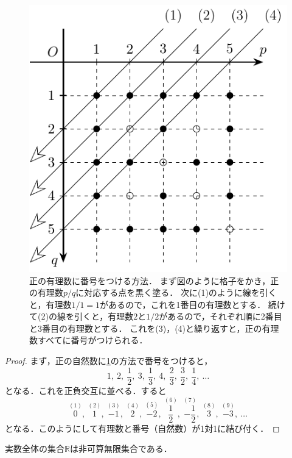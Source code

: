 \documentclass[../sotsu.tex]{subfiles}
\begin{document}
\begin{figure}[tbp]
    \centering
    \includegraphics[width=0.5\linewidth]{rational_countable.pdf}
    \caption{
        正の有理数に番号をつける方法．
        まず図のように格子をかき，正の有理数$p/q$に対応する点を黒く塗る．
        次に(1)のように線を引くと，有理数$1/1 = 1$があるので，これを1番目の有理数とする．
        続けて(2)の線を引くと，有理数$2$と$1/2$があるので，それぞれ順に2番目と3番目の有理数とする．
        これを(3)，(4)と繰り返すと，正の有理数すべてに番号がつけられる．
    }
    \label{fig:positive-rational-count}
\end{figure}


\begin{proof}
    まず，正の自然数に\cref{fig:positive-rational-count}の方法で番号をつけると，
    \[  1, \ 
        2, \ \frac{1}{2}, \ 
        3, \ \frac{1}{3}, \ 
        4, \ \frac{2}{3}, \ \frac{3}{2}, \ \frac{1}{4}, \ 
        \dotsc  \]
    となる．これを正負交互に並べる．すると
    \[  \overset{(1)}{0}, \ 
        \overset{(2)}{1}, \ \overset{(3)}{-1}, \ 
        \overset{(4)}{2}, \ \overset{(5)}{-2}, \ \overset{(6)}{\frac{1}{2}}, \ \overset{(7)}{-\frac{1}{2}}, \ 
        \overset{(8)}{3}, \ \overset{(9)}{-3}, \ \dotsc  \]
    となる．このようにして有理数と番号（自然数）が1対1に結び付く．
\end{proof}



\begin{theorem}
    実数全体の集合$ℝ$は非可算無限集合である\cite[\S 7]{uchida-set-2020}．
\end{theorem}
\end{document}
